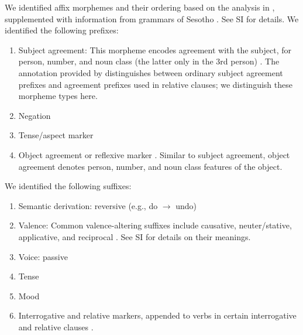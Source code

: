 We identified affix morphemes and their ordering based on the analysis in \cite{demuth1992acquisition}, supplemented with information from grammars of Sesotho \citep{doke1967textbook,guma1971outline}. See SI for details.
We identified the following prefixes:

\begin{enumerate}
    \item Subject agreement: This morpheme encodes agreement with the subject, for person, number, and noun class (the latter only in the 3rd person) \cite[]{doke1967textbook}.
	    The annotation provided by \cite{demuth1992acquisition} distinguishes between ordinary subject agreement prefixes and agreement prefixes used in relative clauses; we distinguish these morpheme types here.
    
    \item Negation \cite[]{doke1967textbook}
    
    \item Tense/aspect marker   \cite[--424]{doke1967textbook}
    
    \item Object agreement or reflexive marker \cite[]{doke1967textbook}. 
    Similar to subject agreement, object agreement denotes person, number, and noun class features of the object.
\end{enumerate}
We identified the following suffixes:

    
\begin{enumerate}
\item Semantic derivation: reversive (e.g., do $\rightarrow$ undo)  \cite[]{doke1967textbook}
\item Valence: Common valence-altering suffixes include causative, neuter/stative, applicative, and reciprocal \cite[--338]{doke1967textbook}. See SI for details on their meanings.
    \item Voice: passive \cite[]{doke1967textbook} 
    \item Tense \cite[]{doke1967textbook}
    \item Mood \cite[--445]{doke1967textbook}
    \item Interrogative and relative markers, appended to verbs in certain interrogative and relative clauses \cite[, 271, 320, 714, 793]{doke1967textbook}.
\end{enumerate}




